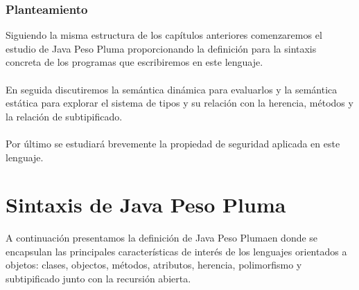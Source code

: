 \subsubsection{Planteamiento}
Siguiendo la misma estructura de los capítulos anteriores comenzaremos el estudio de \textsf{Java Peso Pluma} proporcionando la definición para la sintaxis concreta de los programas que escribiremos en este lenguaje. \\\\
En seguida discutiremos la semántica dinámica para evaluarlos y la semántica estática para explorar el sistema de tipos y su relación con la herencia, métodos y la relación de subtipificado.\\\\
Por último se estudiará brevemente la propiedad de seguridad aplicada en este lenguaje.

\section{Sintaxis de Java Peso Pluma}
A continuación presentamos la definición de \textsf{Java Peso Pluma}en donde se encapsulan las principales características de interés de los lenguajes orientados a objetos: clases, objectos, métodos, atributos, herencia, polimorfismo y subtipificado junto con la recursión abierta.

